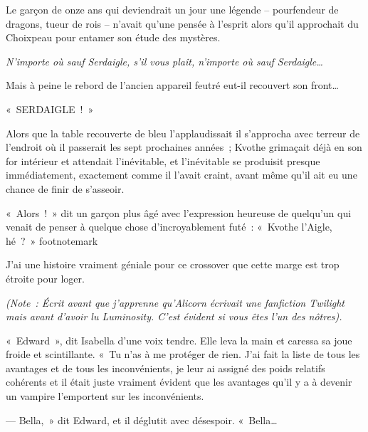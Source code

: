 
Le garçon de onze ans qui deviendrait un jour une légende -- pourfendeur de dragons, tueur de rois -- n'avait qu'une pensée à l'esprit alors qu'il approchait du Choixpeau pour entamer son étude des mystères.

\emph{N'importe où sauf Serdaigle, s'il vous plaît, n'importe où sauf Serdaigle…}

Mais à peine le rebord de l'ancien appareil feutré eut-il recouvert son front…

«~SERDAIGLE~!~»

Alors que la table recouverte de bleu l'applaudissait il s'approcha avec terreur de l'endroit où il passerait les sept prochaines années~; Kvothe grimaçait déjà en son for intérieur et attendait l'inévitable, et l'inévitable se produisit presque immédiatement, exactement comme il l'avait craint, avant même qu'il ait eu une chance de finir de s'asseoir.

«~Alors~!~»
dit un garçon plus âgé avec l'expression heureuse de quelqu'un qui venait de penser à quelque chose d'incroyablement futé~: «~Kvothe l'Aigle, hé~?~»
footnotemark{}


J'ai une histoire vraiment géniale pour ce crossover que cette marge est trop étroite pour loger.


\emph{(Note~: Écrit avant que j'apprenne qu'Alicorn écrivait une fanfiction Twilight mais avant d'avoir lu {Luminosity}.
C'est évident si vous êtes l'un des nôtres).}

«~Edward~», dit Isabella d'une voix tendre.
Elle leva la main et caressa sa joue froide et scintillante.
«~Tu n'as à me protéger de rien.
J'ai fait la liste de tous les avantages et de tous les inconvénients, je leur ai assigné des poids relatifs cohérents et il était juste vraiment évident que les avantages qu'il y a à devenir un vampire l'emportent sur les inconvénients.

--- Bella,~» dit Edward, et il déglutit avec désespoir.
«~Bella…

